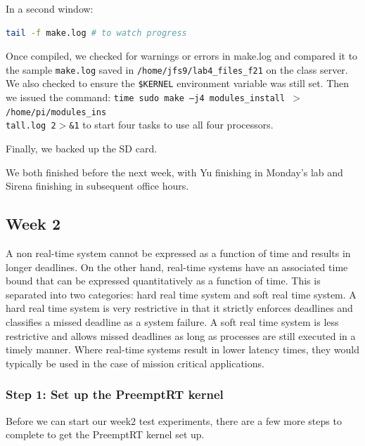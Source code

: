\documentclass[a4paper,10pt]{article}
\newcommand{\code}[1]{\colorbox{light-gray}{\texttt{#1}}}
\begin{document}


In a second window:
\begin{center}
\begin{lstlisting}[language=bash, label=code:code13] 
tail -f make.log # to watch progress
\end{lstlisting}
\end{center}\vspace{-1em}

Once compiled, we checked for warnings or errors in make.log and compared it to the sample \code{make.log} saved in \code{/home/jfs9/lab4\_files\_f21} on the class
server. We also checked to ensure the \code{\$KERNEL} environment variable was still set. Then we issued the command: \code{time sudo make –j4 modules\_install $>$ /home/pi/modules\_ins}\\\code{tall.log 2$>$\&1} to start four tasks to use all four processors. 

Finally, we backed up the SD card.

We both finished before the next week, with Yu finishing in Monday's lab and Sirena finishing in subsequent office hours.
 

\subsection{Week 2}

A non real-time system cannot be expressed as a function of time and results in longer deadlines. On the other hand, real-time systems have an associated time bound that can be expressed quantitatively as a function of time. This is separated into two categories: hard real time system and soft real time system. A hard real time system is very restrictive in that it strictly enforces deadlines and classifies a missed deadline as a system failure. A soft real time system is less restrictive and allows missed deadlines as long as processes are still executed in a timely manner. Where real-time systems result in lower latency times, they would typically be used in the case of mission critical applications.


\subsubsection{Step 1: Set up the PreemptRT kernel}
Before we can start our week2 test experiments, there are a few more steps to complete to get the PreemptRT kernel set up.
\end{document}
